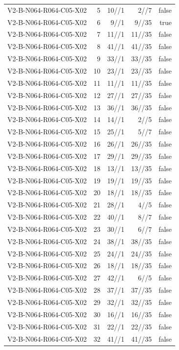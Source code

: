 {\begin{longtable}{lrrrr}
V2-B-N064-R064-C05-X02 & 5 & 10//1 & 2//7 & false \\
V2-B-N064-R064-C05-X02 & 6 & 9//1 & 9//35 & true \\
V2-B-N064-R064-C05-X02 & 7 & 11//1 & 11//35 & false \\
V2-B-N064-R064-C05-X02 & 8 & 41//1 & 41//35 & false \\
V2-B-N064-R064-C05-X02 & 9 & 33//1 & 33//35 & false \\
V2-B-N064-R064-C05-X02 & 10 & 23//1 & 23//35 & false \\
V2-B-N064-R064-C05-X02 & 11 & 11//1 & 11//35 & false \\
V2-B-N064-R064-C05-X02 & 12 & 27//1 & 27//35 & false \\
V2-B-N064-R064-C05-X02 & 13 & 36//1 & 36//35 & false \\
V2-B-N064-R064-C05-X02 & 14 & 14//1 & 2//5 & false \\
V2-B-N064-R064-C05-X02 & 15 & 25//1 & 5//7 & false \\
V2-B-N064-R064-C05-X02 & 16 & 26//1 & 26//35 & false \\
V2-B-N064-R064-C05-X02 & 17 & 29//1 & 29//35 & false \\
V2-B-N064-R064-C05-X02 & 18 & 13//1 & 13//35 & false \\
V2-B-N064-R064-C05-X02 & 19 & 19//1 & 19//35 & false \\
V2-B-N064-R064-C05-X02 & 20 & 18//1 & 18//35 & false \\
V2-B-N064-R064-C05-X02 & 21 & 28//1 & 4//5 & false \\
V2-B-N064-R064-C05-X02 & 22 & 40//1 & 8//7 & false \\
V2-B-N064-R064-C05-X02 & 23 & 30//1 & 6//7 & false \\
V2-B-N064-R064-C05-X02 & 24 & 38//1 & 38//35 & false \\
V2-B-N064-R064-C05-X02 & 25 & 24//1 & 24//35 & false \\
V2-B-N064-R064-C05-X02 & 26 & 18//1 & 18//35 & false \\
V2-B-N064-R064-C05-X02 & 27 & 42//1 & 6//5 & false \\
V2-B-N064-R064-C05-X02 & 28 & 37//1 & 37//35 & false \\
V2-B-N064-R064-C05-X02 & 29 & 32//1 & 32//35 & false \\
V2-B-N064-R064-C05-X02 & 30 & 16//1 & 16//35 & false \\
V2-B-N064-R064-C05-X02 & 31 & 22//1 & 22//35 & false \\
V2-B-N064-R064-C05-X02 & 32 & 41//1 & 41//35 & false \\

\end{longtable}}

